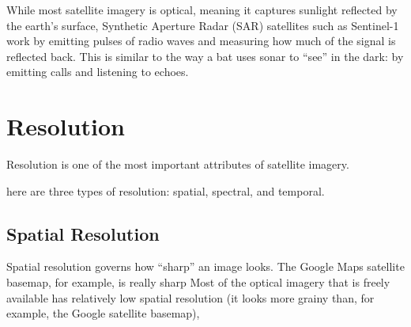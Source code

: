 \documentclass[
  letterpaper,
  DIV=11,
  numbers=noendperiod]{scrreprt}
\begin{document}
While most satellite imagery is optical, meaning it captures sunlight
reflected by the earth's surface, Synthetic Aperture Radar (SAR)
satellites such as Sentinel-1 work by emitting pulses of radio waves and
measuring how much of the signal is reflected back. This is similar to
the way a bat uses sonar to ``see'' in the dark: by emitting calls and
listening to echoes.

\hypertarget{resolution}{%
\section{Resolution}\label{resolution}}

Resolution is one of the most important attributes of satellite imagery.

here are three types of resolution: spatial, spectral, and temporal.

\hypertarget{spatial-resolution}{%
\subsection{Spatial Resolution}\label{spatial-resolution}}

Spatial resolution governs how ``sharp'' an image looks. The Google Maps
satellite basemap, for example, is really sharp Most of the optical
imagery that is freely available has relatively low spatial resolution
(it looks more grainy than, for example, the Google satellite basemap),
\end{document}
